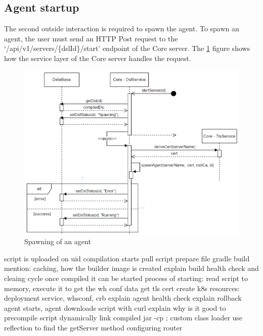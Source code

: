 \subsection{Agent startup}

The second outside interaction is required to spawn the agent. To spawn an agent, the user must send an HTTP Post request to the `/api/v1/servers/\{dslId\}/start' endpoint of the Core server. The \ref{fig:start1} figure shows how the service layer of the Core server handles the request.

\begin{figure}[h]
    \centering
    \includegraphics[width=130mm, keepaspectratio]{seq5.png}
    \caption{Spawning of an agent}
    \label{fig:start1}
\end{figure}

script is uploaded on uid
compilation starts
    pull script
    prepare file
    gradle build
    mention: caching, how the builder image is created
    explain build health check and cleaing cycle
once compiled it can be started
process of starting:    
    read script to memory, execute it to get the wh conf data
    get tls cert
    create k8s resources: deployment service, whsconf, crb
    explain agent health check
    explain rollback
agent starts, agent downloads script with curl
    explain why is it good to precompile script
    dynamically link compiled jar -cp ; custom class loader
    use reflection to find the getServer method
    configuring router